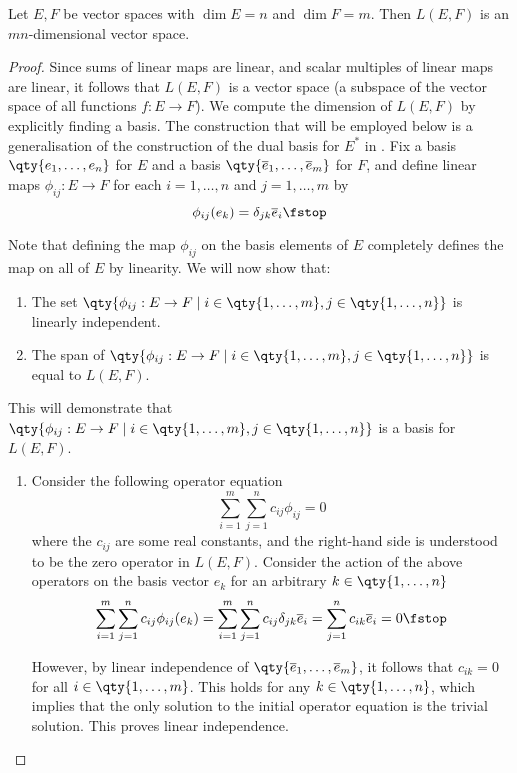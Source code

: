  \begin{theorem}
   Let \( E,F \) be vector spaces with \( \dim E=n \) and \( \dim F=m \). Then \( L(E,F) \) is an \( mn \)-dimensional vector space.
 \end{theorem}
 \begin{proof}
   Since sums of linear maps are linear, and scalar multiples of linear maps are linear, it follows that \( L(E,F) \) is a vector space (a subspace of the vector space of all functions \( f:E\to F \)). We compute the dimension of \( L(E,F) \) by explicitly finding a basis. The construction that will be employed below is a generalisation of the construction of the dual basis for \( E^* \) in . Fix a basis \( \qty{e_1,\dots,e_n} \) for \( E \) and a basis \( \qty{\overline{e}_1,\dots,\overline{e}_m} \) for \( F \), and define linear maps \( \phi_{ij}:E\to F \) for each \( i=1,\dots,n \) and \( j=1,\dots,m \) by
   \[ \phi_{ij}(e_k)=\delta_{jk}\overline{e}_i\fstop \]

   Note that defining the map \( \phi_{ij} \) on the basis elements of \( E \) completely defines the map on all of \( E \) by linearity. We will now show that:
   \begin{enumerate}[label=(\roman*)]
   \item The set \( \qty{\phi_{ij}:E\to F\mid i\in\qty{1,\dots,m}, j\in\qty{1,\dots,n}} \) is linearly independent.
   \item The span of \( \qty{\phi_{ij}:E\to F\mid i\in\qty{1,\dots,m}, j\in\qty{1,\dots,n}} \) is equal to \( L(E,F) \).
   \end{enumerate}

   This will demonstrate that \( \qty{\phi_{ij}:E\to F\mid i\in\qty{1,\dots,m}, j\in\qty{1,\dots,n}} \) is a basis for \( L(E,F) \).

   \begin{enumerate}[label=(\roman*)]
   \item Consider the following operator equation
     \[ \sum_{i=1}^m\sum_{j=1}^n c_{ij}\phi_{ij}=0 \]
     where the \( c_{ij} \) are some real constants, and the right-hand side is understood to be the zero operator in \( L(E,F) \). Consider the action of the above operators on the basis vector \( e_k \) for an arbitrary \( k\in\qty{1,\dots,n} \)
     \[ \sum_{i=1}^m\sum_{j=1}^nc_{ij}\phi_{ij}(e_k)=\sum_{i=1}^m\sum_{j=1}^nc_{ij}\delta_{jk}\overline{e}_i=\sum_{j=1}^nc_{ik}\overline{e}_i=0\fstop \]

     However, by linear independence of \( \qty{\overline{e}_1,\dots,\overline{e}_m} \), it follows that \( c_{ik}=0 \) for all \( i\in\qty{1,\dots, m} \). This holds for any \( k\in\qty{1,\dots,n} \), which implies that the only solution to the initial operator equation is the trivial solution. This proves linear independence.


\end{enumerate}
\end{proof}
